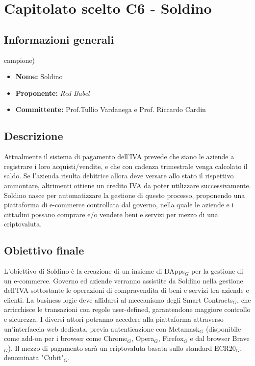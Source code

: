 \section{Capitolato scelto C6 - Soldino}
\subsection{Informazioni generali}
campione)
% 
\begin{itemize}
\item
\textbf{Nome:} Soldino
\item
\textbf{Proponente:} \textit{Red Babel} 
\item
\textbf{Committente:} Prof.Tullio Vardanega e Prof. Riccardo Cardin
\end{itemize}
\subsection{Descrizione}
Attualmente il sistema di pagamento dell'IVA prevede che siano le aziende a 
registrare i loro acquisti/vendite, e che con cadenza trimestrale venga 
calcolato il saldo. Se l'azienda risulta debitrice allora deve versare allo 
stato il rispettivo ammontare, altrimenti ottiene un credito IVA da poter 
utilizzare successivamente. \\Soldino nasce per automatizzare la gestione di 
questo processo, proponendo una piattaforma di e-commerce controllata dal 
governo, nella quale le aziende e i cittadini possano comprare e/o vendere beni 
e servizi per mezzo di una criptovaluta.

\subsection{Obiettivo finale}
L'obiettivo di Soldino è la creazione di un insieme di ÐApps$_{G}$ per la 
gestione di un e-commerce. Governo ed aziende verranno assistite da Soldino 
nella gestione dell'IVA sottostante le operazioni di compravendita di beni e 
servizi tra aziende e clienti. La business logic deve affidarsi al meccanismo 
degli Smart Contracts$_{G}$, che arricchisce le transazioni con regole 
user-defined, garantendone maggiore controllo e sicurezza. I diversi attori 
potranno accedere alla piattaforma attraverso un'interfaccia web dedicata, 
previa autenticazione con Metamask$_G$ (disponibile come add-on per i browser 
come Chrome$_{G}$, Opera$_{G}$, Firefox$_{G}$ e dal browser Brave$_{G}$).  Il 
mezzo di pagamento sarà un criptovaluta basata sullo standard ECR20$_{G}$, 
denominata "Cubit"$_{G}$.

